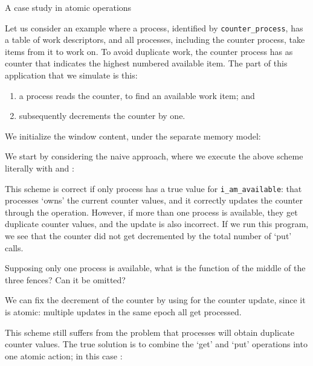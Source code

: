  {A case study in atomic operations}

Let us consider an example where a process,
identified by \lstinline+counter_process+,
has a table of work descriptors,
and all processes, including the counter process,
take items from it to work on.
To avoid duplicate work, the counter process has as counter
that indicates the highest numbered available item.
The part of this application that we simulate is this:
\begin{enumerate}
\item a process reads the counter, to find an available work item; and
\item subsequently decrements the counter by one.
\end{enumerate}

We initialize the window content, under the separate memory model:
%

We start by considering the naive approach, where we execute the above scheme
literally with  and :
%

This scheme is correct if only process
has a true value for \lstinline+i_am_available+:
that processes `owns' the current counter values,
and it correctly updates the counter
through the  operation.
However, if more than one process is available,
they get duplicate counter values, and the update
is also incorrect.
If we run this program, we see that the counter did not get
decremented by the total number of `put' calls.

\begin{exercise}
  Supposing only one process is available, what is the function
  of the middle of the three fences? Can it be omitted?
\end{exercise}

We can fix the decrement of the counter by using 
for the counter update, since it is atomic:
multiple updates in the same epoch all get processed.
%

This scheme still suffers from the problem that processes will obtain duplicate
counter values. The true solution is to combine the `get' and `put' operations
into one atomic action; in this case :
%

